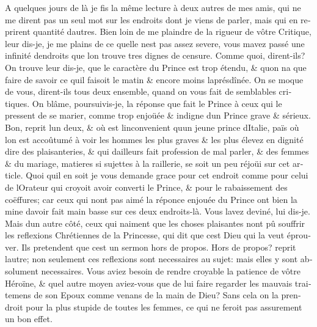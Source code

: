 \documentclass[14pt,a4paper]{memoir}
\begin{document}
{{\begin{otherlanguage}{french}
A quelques jours de là je fis la même lecture à deux autres de mes amis,
qui ne me dirent pas un seul mot sur les endroits dont je viens de
parler, mais qui en reprirent quantité d\textquotesingle autres. Bien
loin de me plaindre de la rigueur de vôtre Critique, leur dis-je, je me
plains de ce qu\textquotesingle elle n\textquotesingle est pas assez
severe, vous m\textquotesingle avez passé une infinité
d\textquotesingle endroits que l\textquotesingle on trouve tres dignes
de censure. Comme quoi, dirent-ils? On trouve leur dis-je, que le
caractère du Prince est trop étendu, \& qu\textquotesingle on
n\textquotesingle a que faire de savoir ce qu\textquotesingle il faisoit
le matin \& encore moins l\textquotesingle aprésdînée. On se moque de
vous, dirent-ils tous deux ensemble, quand on vous fait de semblables
critiques. On blâme, poursuivis-je, la réponse que fait le Prince à ceux
qui le pressent de se marier, comme trop enjoüée \& indigne
d\textquotesingle un Prince grave \& sérieux. Bon, reprit
l\textquotesingle un d\textquotesingle eux, \& où est
l\textquotesingle inconvenient qu\textquotesingle un jeune prince
d\textquotesingle Italie, païs où l\textquotesingle on est accoûtumé à
voir les hommes les plus graves \& les plus élevez en dignité dire des
plaisanteries, \& qui d\textquotesingle ailleurs fait profession de mal
parler, \& des femmes \& du mariage, matieres si sujettes à la
raillerie, se soit un peu réjoüi sur cet article. Quoi
qu\textquotesingle il en soit je vous demande grace pour cet endroit
comme pour celui de l\textquotesingle Orateur qui croyoit avoir converti
le Prince, \& pour le rabaissement des coëffures; car ceux qui
n\textquotesingle ont pas aimé la réponce enjouée du Prince ont bien la
mine d\textquotesingle avoir fait main basse sur ces deux endroits-là.
Vous l\textquotesingle avez deviné, lui dis-je. Mais
d\textquotesingle un autre côté, ceux qui n\textquotesingle aiment que
les choses plaisantes n\textquotesingle ont pû souffrir les reflexions
Chrétiennes de la Princesse, qui dit que c\textquotesingle est Dieu qui
la veut éprouver. Ils pretendent que c\textquotesingle est un sermon
hors de propos. Hors de propos? reprit l\textquotesingle autre; non
seulement ces reflexions sont necessaires au sujet: mais elles y sont
absolument necessaires. Vous aviez besoin de rendre croyable la patience
de vôtre Héroïne, \& quel autre moyen aviez-vous que de lui faire
regarder les mauvais traitemens de son Epoux comme venans de la main de
Dieu? Sans cela on la prendroit pour la plus stupide de toutes les
femmes, ce qui ne feroit pas assurement un bon effet.


\end{otherlanguage}}}
\end{document}
